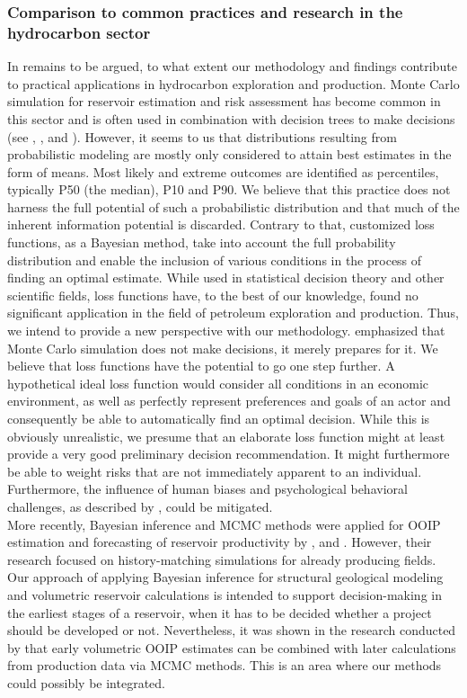 	\subsubsection{Comparison to common practices and research in the hydrocarbon sector}		
	In remains to be argued, to what extent our methodology and findings contribute to practical applications in hydrocarbon exploration and production. Monte Carlo simulation for reservoir estimation and risk assessment has become common in this sector and is often used in combination with decision trees to make decisions (see \citet{murtha1997monte}, \citet{mudford2000valuing}, \citet{wim2001guidelines} and \citet{bratvold2010making}). However, it seems to us that distributions resulting from probabilistic modeling are mostly only considered to attain best estimates in the form of means. Most likely and extreme outcomes are identified as percentiles, typically P50 (the median), P10 and P90. We believe that this practice does not harness the full potential of such a probabilistic distribution and that much of the inherent information potential is discarded. Contrary to that, customized loss functions, as a Bayesian method, take into account the full probability distribution and enable the inclusion of various conditions in the process of finding an optimal estimate. While used in statistical decision theory and other scientific fields, loss functions have, to the best of our knowledge, found no significant application in the field of petroleum exploration and production. Thus, we intend to provide a new perspective with our methodology. \citet{murtha1997monte} emphasized that Monte Carlo simulation does not make decisions, it merely prepares for it. We believe that loss functions have the potential to go one step further. A hypothetical ideal loss function would consider all conditions in an economic environment, as well as perfectly represent preferences and goals of an actor and consequently be able to automatically find an optimal decision. While this is obviously unrealistic, we presume that an elaborate loss function might at least provide a very good preliminary decision recommendation. It might furthermore be able to weight risks that are not immediately apparent to an individual. Furthermore, the influence of human biases and psychological behavioral challenges, as described by \citet{bratvold2010making}, could be mitigated.\\
	More recently, Bayesian inference and MCMC methods were applied for OOIP estimation and forecasting of reservoir productivity by \citet{wadsley2005markov}, \citet{ma2006multistage} and \citet{liu2010continuous}. However, their research focused on history-matching simulations for already producing fields. Our approach of applying Bayesian inference for structural geological modeling and volumetric reservoir calculations is intended to support decision-making in the earliest stages of a reservoir, when it has to be decided whether a project should be developed or not. Nevertheless, it was shown in the research conducted by \citet{wadsley2005markov} that early volumetric OOIP estimates can be combined with later calculations from production data via MCMC methods. This is an area where our methods could possibly be integrated.\\
